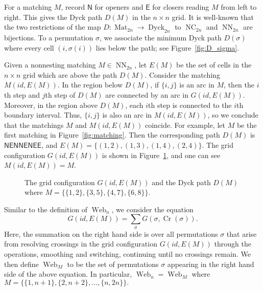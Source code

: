 \documentclass[reqno,12pt]{amsart}
\theoremstyle{definition}
\theoremstyle{remark}
\newcommand\Dyck{\operatorname{Dyck}}
\newcommand\NC{\operatorname{NC}}
\newcommand\NN{\operatorname{NN}}
\newcommand\Mat{\operatorname{Mat}}
\newcommand\Cr{\operatorname{Cr}}
\newcommand\Web{\operatorname{Web}}
\newcommand\NS{\mathsf{N}}
\newcommand\ES{\mathsf{E}}
\newcommand\Xmarking[2]
{\draw[very thick] (#1-0.7,#2-0.7)--(#1-0.3,#2-0.3);
\draw[very thick] (#1-0.7,#2-0.3)--(#1-0.3,#2-0.7);
\draw (#1-1,#2-0.5)--(#1-0.5,#2-0.5);
\draw (#1-0.5,#2-0.5)--(#1-0.5,#2); }
\newcommand\Cross[2]
{\draw (#1-0.5,#2)--(#1-0.5,#2-1);
\draw (#1,#2-0.5)--(#1-1,#2-0.5); }
\newcommand\Asmooth[2]
{\draw (#1,#2-0.5) .. controls (#1-0.45,#2-0.45) and (#1-0.45,#2-0.45) .. (#1-0.5,#2);
\draw (#1-1,#2-0.5) .. controls (#1-0.55,#2-0.55) and (#1-0.55,#2-0.55) .. (#1-0.5,#2-1); }
\begin{document}
For a matching $M$, record $\NS$ for openers and $\ES$ for closers reading $M$
from left to right.
This gives the Dyck path $D(M)$ in the $n \times n$ grid.
It is well-known that the two restrictions of the map
\( D:\Mat_{2n}\rightarrow \Dyck_{2n} \) to \( \NC_{2n} \) and \( \NN_{2n} \)
are bijections.
To a permutation $\sigma$, we associate the minimum Dyck path \( D(\sigma) \)
where every cell \( (i,\sigma(i)) \) lies below the path;
see Figure~\ref{fig:D_sigma}.

Given a nonnesting matching \( M\in\NN_{2n} \), let \( E(M) \) be the set of
cells in the $n \times n$ grid which are above the path $D(M)$.
Consider the matching \( M(id,E(M)) \).
In the region below \( D(M) \), if \( \{i,j\} \) is an arc in \( M \), then the
\( i \)th step and \( j \)th step of \( D(M) \) are connected by an arc in
\( G(id,E(M)) \). Moreover, in the region above \( D(M) \), each
\( i \)th step is connected to the \( i \)th boundary interval.
Thus, \( \{i,j\} \) is also an arc in \( M(id,E(M)) \), so we conclude that the
matchings \( M \) and \( M(id,E(M)) \) coincide.
For example, let \( M \) be the first matching in Figure~\ref{fig:matching}.
Then the corresponding path \( D(M) \) is \( \NS\ES\NS\NS\ES\NS\ES\ES \),
and \( E(M) = \{ (1,2), (1,3), (1,4), (2,4) \} \).
The grid configuration \( G(id, E(M)) \) is shown in Figure~\ref{fig:G(id,E(M))},
and one can see \( M(id, E(M)) = M \).
\begin{figure}
  \caption{The grid configuration \( G(id, E(M)) \) and the Dyck path \( D(M) \)
  where \( M=\{ \{1,2\},\{3,5\},\{4,7\},\{6,8\} \} \).}
  \label{fig:G(id,E(M))}
\end{figure}
Similar to the definition of \( \Web_n \), we consider the equation
\[
  G(id,E(M)) = \sum_\sigma G(\sigma,\Cr(\sigma)).
\]
Here, the summation on the right hand side is over all permutations $\sigma$ that
arise from resolving crossings in the grid configuration $G(id, E(M))$ through the
operations, smoothing and switching, continuing until no crossings remain.
We then define \( \Web_M \) to be the set of permutations \( \sigma \) appearing
in the right hand side of the above equation.
In particular, \( \Web_n = \Web_M \) where
\( M=\{ \{1,n+1\}, \{2,n+2\},\dots, \{n,2n\} \}. \)
\end{document}

